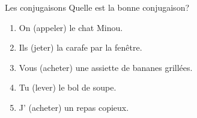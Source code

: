 \begin{frame}{Les conjugaisons}
  Quelle est la bonne conjugaison? \\
  \begin{enumerate}
    \item On \underline{} (appeler) le chat Minou.
    \item Ils \underline{} (jeter) la carafe par la fenêtre.
    \item Vous \underline{} (acheter) une assiette de bananes grillées.
    \item Tu \underline{} (lever) le bol de soupe.
    \item J'\underline{} (acheter) un repas copieux.
  \end{enumerate}
\end{frame}
